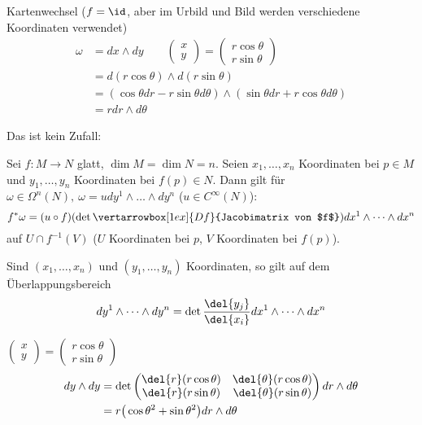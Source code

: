 \begin{exmp*}
	Kartenwechsel ($ f = \id $, aber im Urbild und Bild werden verschiedene Koordinaten verwendet)
	\begin{align*}
		\omega &= dx \wedge dy \qquad \begin{pmatrix}
			x\\y
		\end{pmatrix} = \begin{pmatrix}
		r\cos\theta\\r\sin\theta
	\end{pmatrix}\\
			&= d(r\cos\theta) \wedge d(r\sin\theta) \\
			&= (\cos\theta dr - r\sin \theta d \theta) \wedge (\sin\theta dr + r\cos\theta d \theta)\\
			&= rdr \wedge d\theta
	\end{align*}
\end{exmp*}

Das ist kein Zufall:

\begin{lem}
	Sei $ f: M \to N $ glatt, $ \dim M = \dim N = n $. Seien $ x_1,\dotsc,x_n $ Koordinaten bei $p \in M$ und $ y_1,\dotsc,y_n $ Koordinaten bei $ f(p) \in N $. Dann gilt für $ \omega \in \Omega^n(N),\ \omega = u dy^1 \wedge \dots \wedge dy^n $ ($u \in C^\infty(N)$):
	\[ f^*\omega = (u \circ f)(\det \vertarrowbox[1ex]{Df}{Jacobimatrix von $f$}) dx^1 \wedge \dots \wedge dx^n \]
	auf $ U \cap f^{-1}(V) $ ($U$ Koordinaten bei $p$, $V$ Koordinaten bei $f(p)$).
\end{lem}

\begin{cor*}
	Sind $ (x_1,\dotsc,x_n) $ und $ (y_1,\dotsc,y_n) $ Koordinaten, so gilt auf dem Überlappungsbereich
	\[ dy^1 \wedge \dots \wedge dy^n = \det \frac{\del{y_j}}{\del{x_i}} dx^1 \wedge \dots \wedge dx^n \]
\end{cor*}

\begin{exmp*}
	$ \begin{pmatrix}
		x\\y
	\end{pmatrix} = \begin{pmatrix}
		r\cos\theta\\r\sin\theta
	\end{pmatrix} $
	\begin{align*}
		dy \wedge dy &= \det \begin{pmatrix}
			\del{r}(r\cos\theta) & \del{\theta}(r\cos\theta)\\
			\del{r}(r\sin\theta) & \del{\theta}(r\sin\theta)
		\end{pmatrix} dr \wedge d\theta\\
		&= r\big(\cos\theta^2 + \sin\theta^2\big) dr \wedge d\theta
	\end{align*}
\end{exmp*}

